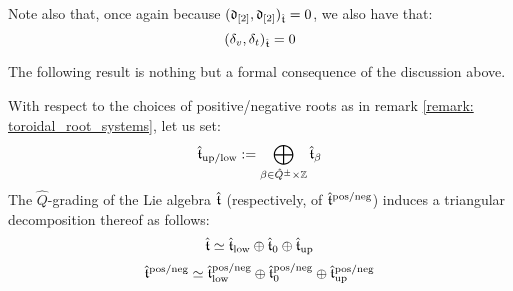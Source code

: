 \begin{remark}
\begin{enumerate}
                Note also that, once again because $(\mathfrak{d}_{[2]}, \mathfrak{d}_{[2]})_{\hat{\mathfrak{t}}} = 0$, we also have that:
                    $$(\delta_v, \delta_t)_{\hat{\mathfrak{t}}} = 0$$
            \end{enumerate}
        \end{remark}
        
        The following result is nothing but a formal consequence of the discussion above.
        \begin{proposition} \label{prop: triangular_decomposition_of_extended_toroidal_lie_algebras}
            With respect to the choices of positive/negative roots as in remark \ref{remark: toroidal_root_systems}, let us set:
                $$\extendedtoroidal_{\up/\low} := \bigoplus_{\beta \in \hat{Q}^{\pm} \x \Z} \extendedtoroidal_{\beta}$$
            The $\hat{Q}$-grading of the Lie algebra $\hat{\mathfrak{t}}$ (respectively, of $\hat{\mathfrak{t}}^{\mathrm{pos}/\mathrm{neg}}$) induces a triangular decomposition thereof as follows:
                $$\hat{\mathfrak{t}} \simeq \hat{\mathfrak{t}}_{\mathrm{low}} \oplus \hat{\mathfrak{t}}_0 \oplus \hat{\mathfrak{t}}_{\mathrm{up}}$$
                $$\hat{\mathfrak{t}}^{\mathrm{pos}/\mathrm{neg}} \simeq \hat{\mathfrak{t}}^{\mathrm{pos}/\mathrm{neg}}_{\mathrm{low}} \oplus \hat{\mathfrak{t}}^{\mathrm{pos}/\mathrm{neg}}_0 \oplus \hat{\mathfrak{t}}^{\mathrm{pos}/\mathrm{neg}}_{\mathrm{up}}$$
        \end{proposition}